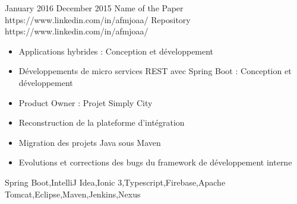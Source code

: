 
\horizontalLine
\begin{universalList}
  \universalListItem
    {January 2016}
    {December 2015}
    {Name of the Paper}
    {https://www.linkedin.com/in/afmjoaa/}
    {Repository}
    {https://www.linkedin.com/in/afmjoaa/}
    {
      \begin{itemize}
        \item Applications hybrides : Conception et développement
        \item Développements de micro services REST avec Spring Boot : Conception et développement
        \item Product Owner : Projet Simply City
        \item Reconstruction de la plateforme d'intégration
        \item Migration des projets Java sous Maven
        \item Evolutions et corrections des bugs du framework de développement interne
      \end{itemize}
    }
    {Spring Boot,IntelliJ Idea,Ionic 3,Typescript,Firebase,Apache Tomcat,Eclipse,Maven,Jenkins,Nexus}
\end{universalList}%

